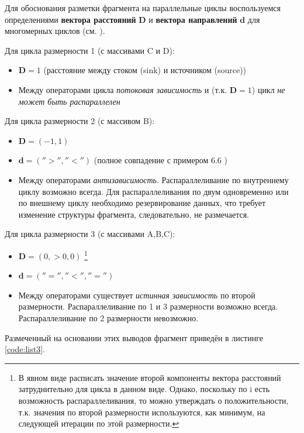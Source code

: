 \documentclass[12pt, fleqn]{article}
\theoremstyle{definition}
\begin{document}
Для обоснования разметки фрагмента на параллельные циклы воспользуемся определениями \textbf{вектора расстояний} $\mathbf{D}$ и \textbf{вектора направлений} $\mathbf{d}$ для многомерных циклов (см. \cite{lobanov6}).

Для цикла размерности 1 (с массивами C и D):
\begin{itemize}
 \item $\mathbf{D} = 1$ (расстояние между стоком (sink) и источником (source))
 \item Между операторами цикла \textit{потоковая зависимость} и (т.к. $\mathbf{D} = 1$) цикл \textit{не может быть распараллелен}
\end{itemize}
Для цикла размерности 2 (с массивом B):
\begin{itemize}
 \item $\mathbf{D} = \left(-1, 1\right)$
 \item $\mathbf{d} = \left(''>'', ''<''\right)$ (полное совпадение с примером 6.6 \cite{lobanov6})
 \item Между операторами \textit{антизависимость}. Распараллеливание по внутреннему циклу возможно всегда.
 Для распараллеливания по двум одновременно или по внешнему циклу необходимо резервирование данных, что требует изменение структуры фрагмента, следовательно, не размечается.
\end{itemize}

Для цикла размерности 3 (с массивами A,B,C):
\begin{itemize}
 \item $\mathbf{D} = \left(0, >0, 0\right)$ \footnote{В явном виде расписать значение второй компоненты вектора расстояний затруднительно для цикла в данном виде. Однако, поскольку по i есть возможность распараллеливания, то можно утверждать о положительности, т.к. значения по второй размерности используются, как минимум, на следующей итерации по этой размерности.}
 \item $\mathbf{d} = \left(''='', ''<'', ''=''\right)$
 \item Между операторами существует \textit{истинная зависимость} по второй размерности. Распараллеливание по 1 и 3 размерности возможно всегда. Распараллеливание по 2 размерности невозможно.
\end{itemize}

Размеченный на основании этих выводов фрагмент приведён в листинге \ref{code:list3}.
{}
\end{document}

